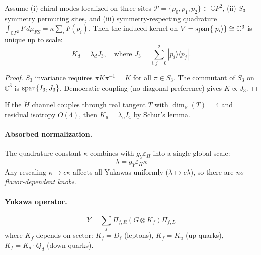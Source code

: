 \begin{lemma}\label{lem:kernel}
Assume (i) chiral modes localized on three sites $\mathcal{P} = \{p_0, p_1, p_2\} \subset \mathbb{C}P^2$, 
(ii) $S_3$ symmetry permuting sites, and (iii) symmetry-respecting quadrature 
$\int_{\mathbb{C}P^2} F \, d\mu_{FS} = \kappa \sum_i F(p_i)$.
Then the induced kernel on $V = {\rm span}\{|p_i\rangle\} \cong \mathbb{C}^3$ is unique up to scale:
\begin{equation}
K_d = \lambda_d J_3, \quad \text{where } J_3 = \sum_{i,j=0}^{2} |p_i\rangle\langle p_j|.
\end{equation}
\end{lemma}

\begin{proof}
$S_3$ invariance requires $\pi K \pi^{-1} = K$ for all $\pi \in S_3$.
The commutant of $S_3$ on $\mathbb{C}^3$ is ${\rm span}\{I_3, J_3\}$.
Democratic coupling (no diagonal preference) gives $K \propto J_3$.
\end{proof}

\begin{corollary}
If the $\tilde{H}$ channel couples through real tangent $T$ with $\dim_{\mathbb{R}}(T) = 4$ 
and residual isotropy $O(4)$, then $K_u = \lambda_u I_4$ by Schur's lemma.
\end{corollary}

\paragraph{Absorbed normalization.}
The quadrature constant $\kappa$ combines with $g_Y \varepsilon_H$ into a single global scale:
\begin{equation}
\lambda = g_Y \varepsilon_H \kappa
\end{equation}
Any rescaling $\kappa \mapsto c\kappa$ affects all Yukawas uniformly ($\lambda \mapsto c\lambda$), 
so there are \emph{no flavor-dependent knobs}.

\paragraph{Yukawa operator.}
\begin{equation}
Y = \sum_f \Pi_{f,R} (G \otimes K_f) \Pi_{f,L}
\end{equation}
where $K_f$ depends on sector: $K_f = D_\ell$ (leptons), $K_f = K_u$ (up quarks), 
$K_f = K_d \cdot Q_d$ (down quarks).

